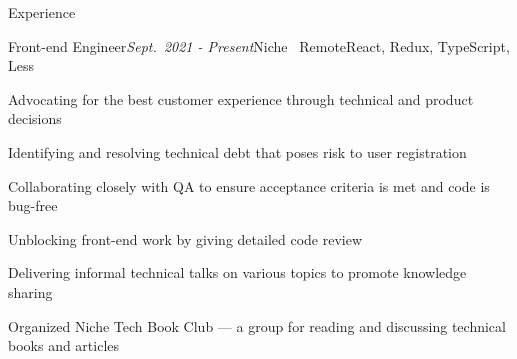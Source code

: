 \documentclass{resume} %
\begin{document}

\begin{rSection}{Experience}
\begin{rSubsection}{Front-end Engineer}{\em Sept.\ 2021 - Present}{Niche \textbar \ Remote}{React, Redux, TypeScript, Less}




\item Advocating for the best customer experience through technical and product decisions
\item Identifying and resolving technical debt that poses risk to user registration
\item Collaborating closely with QA to ensure acceptance criteria is met and code is bug-free
\item Unblocking front-end work by giving detailed code review
\item Delivering informal technical talks on various topics to promote knowledge sharing
\item Organized Niche Tech Book Club — a group for reading and discussing technical books and articles
\end{rSubsection}


\end{rSection}
\end{document}
